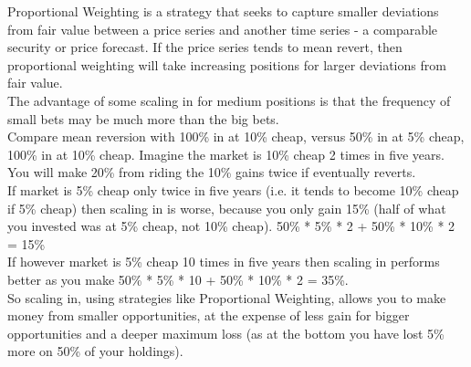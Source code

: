 \documentclass{article}
\begin{document}
Proportional Weighting is a strategy that seeks to capture smaller deviations from fair value between a price series and another time series - a comparable security or price forecast. If the price series tends to mean revert, then proportional weighting will take increasing positions for larger deviations from fair value.
\\
The advantage of some scaling in for medium positions is that the frequency of small bets may be much more than the big bets.
\\
Compare mean reversion with 100\% in at 10\% cheap, versus 50\% in at 5\% cheap, 100\% in at 10\% cheap. Imagine the market is 10\% cheap 2 times in five years. You will make 20\% from riding the 10\% gains twice if eventually reverts.
\\
If market is 5\% cheap only twice in five years (i.e. it tends to become 10\% cheap if 5\% cheap) then scaling in is worse, because you only gain 15\% (half of what you invested was at 5\% cheap, not 10\% cheap). 50\% * 5\% * 2 + 50\% * 10\% * 2 = 15\%
\\
If however market is 5\% cheap 10 times in five years then scaling in performs better as you make 50\% * 5\% * 10 + 50\% * 10\% * 2 =  35\%.
\\
So scaling in, using strategies like Proportional Weighting, allows you to make money from smaller opportunities, at the expense of less gain for bigger opportunities and a deeper maximum loss (as at the bottom you have lost 5\% more on 50\% of your holdings).

\keyterms

\furtherlinks %
\end{document}
